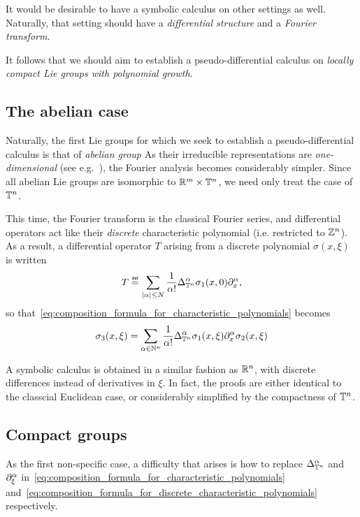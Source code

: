 It would be desirable to have a symbolic calculus on other settings as well.
Naturally, that setting should have a \emph{differential structure} and a \emph{Fourier transform}.

It follows that we should aim to establish a pseudo-differential calculus on \emph{locally compact Lie groups with polynomial growth}.

\subsection{The abelian case}

Naturally, the first Lie groups for which we seek to establish a pseudo-differential calculus is that of \emph{abelian group}
As their irreducible representations are \emph{one-dimensional} (see e.g.~\cite[Corollary 6.3.26]{RuzhanskyTurunen10}),
the Fourier analysis becomes considerably simpler.
Since all abelian Lie groups are isomorphic to $\R^m \times \T^n$,
we need only treat the case of $\T^n$.

This time,
the Fourier transform is the classical Fourier series,
and differential operators act like their \emph{discrete} characteristic polynomial (i.e. restricted to $\Z^n$).
As a result,
a differential operator $T$ arising from a discrete polynomial $\sigma(x, \xi)$ is written
\begin{align*}
    T \defeq \sum_{\abs \alpha \leq N} \frac 1 {\alpha!} \DifferenceOperatorOrder [\T^n] \alpha \sigma_1(x, 0) \iD{x^\alpha},
\end{align*}
so that~\eqref{eq:composition_formula_for_characteristic_polynomials} becomes
\begin{align}
    \sigma_3(x, \xi) = \sum_{\alpha \in \N^n} \frac 1 {\alpha!} \DifferenceOperatorOrder [\T^n] \alpha \sigma_1(x, \xi) \iD{x^\alpha} \sigma_2(x, \xi)
    \label{eq:composition_formula_for_discrete_characteristic_polynomials}
\end{align}

A symbolic calculus is obtained in a similar fashion as $\R^n$,
with discrete differences instead of derivatives in $\xi$.
In fact, the proofs are either identical to the classcial Euclidean case,
or considerably simplified by the compactness of $\T^n$.

\subsection{Compact groups}

As the first non-specific case,
a difficulty that arises is how to replace $\DifferenceOperatorOrder [\T^n] \alpha$ and $\iD{\xi^\alpha}$
in~\eqref{eq:composition_formula_for_characteristic_polynomials} and~\eqref{eq:composition_formula_for_discrete_characteristic_polynomials} respectively.

